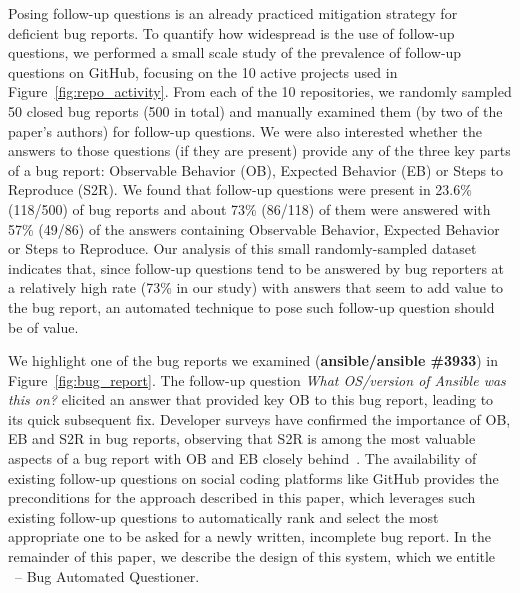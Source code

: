 Posing follow-up questions is an already practiced mitigation strategy for deficient bug
reports. To quantify how widespread is the use of
follow-up questions, we performed a small scale study of the prevalence
of follow-up questions on GitHub, focusing on the 10 active projects used in Figure~\ref{fig:repo_activity}.
From each of the 10 repositories, we randomly sampled 50 closed bug reports (500 in total) and manually examined them (by two of the paper's authors) for follow-up questions. We were also interested whether the answers to those questions (if they are present) provide any
of the three key parts of a bug report: Observable Behavior (OB), Expected Behavior (EB) or Steps to Reproduce (S2R).
We found that follow-up questions were present in 23.6\% (118/500) of bug reports and about 73\% (86/118) of them were
answered with 57\% (49/86) of the answers containing Observable Behavior, Expected Behavior or Steps to Reproduce.
Our analysis of this small randomly-sampled dataset indicates that, since follow-up questions tend to be answered by bug reporters at a relatively high rate (73\% in our study) with answers that seem to add value to the bug report, an automated technique to pose such follow-up question should be of value.

We highlight one of the bug reports we examined ({\bf ansible/ansible \#3933}) in Figure~\ref{fig:bug_report}. The follow-up question {\em What OS/version of
Ansible was this on?} elicited an answer that provided key OB to this bug report, leading to its quick subsequent fix.
Developer surveys have confirmed the importance of OB, EB and S2R in bug reports, observing that S2R is among the most valuable aspects of a bug report
with OB and EB closely behind~\cite{zimmermann10whatmakes,laukkanen2011survey}. The availability of existing follow-up questions on social coding platforms like GitHub provides the preconditions for the approach described in this paper, which leverages such existing follow-up questions to automatically rank and select the most appropriate one to be asked for a newly written, incomplete bug report. In the remainder of this paper, we describe the design of this system, which we entitle \evpi\ -- Bug Automated Questioner\footnotemark{}.
